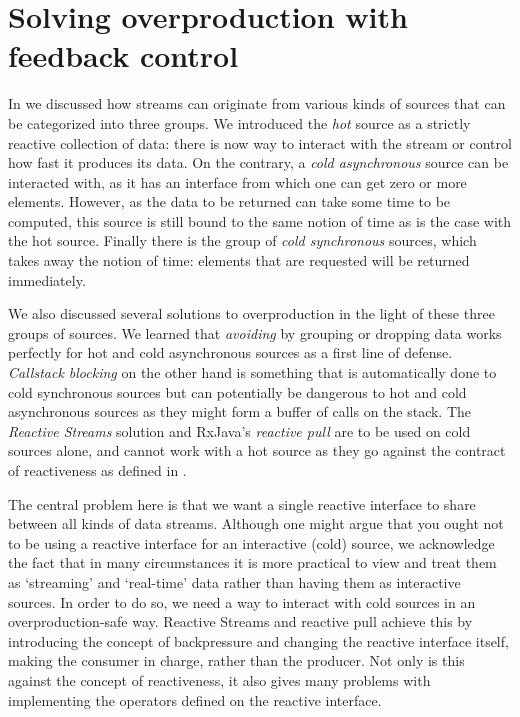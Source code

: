 \chapter{Solving overproduction with feedback control}
\label{chap:solving-overproduction}

In  we discussed how streams can originate from various kinds of sources that can be categorized into three groups. We introduced the \textit{hot} source as a strictly reactive collection of data: there is now way to interact with the stream or control how fast it produces its data. On the contrary, a \textit{cold asynchronous} source can be interacted with, as it has an interface from which one can get zero or more elements. However, as the data to be returned can take some time to be computed, this source is still bound to the same notion of time as is the case with the hot source. Finally there is the group of \textit{cold synchronous} sources, which takes away the notion of time: elements that are requested will be returned immediately.

We also discussed several solutions to overproduction in the light of these three groups of sources. We learned that \textit{avoiding} by grouping or dropping data works perfectly for hot and cold asynchronous sources as a first line of defense. \textit{Callstack blocking} on the other hand is something that is automatically done to cold synchronous sources but can potentially be dangerous to hot and cold asynchronous sources as they might form a buffer of calls on the stack. The \textit{Reactive Streams} solution and RxJava's \textit{reactive pull} are to be used on cold sources alone, and cannot work with a hot source as they go against the contract of reactiveness as defined in \cite{berry1991-Reactive}.

The central problem here is that we want a single reactive interface to share between all kinds of data streams. Although one might argue that you ought not to be using a reactive interface for an interactive (cold) source, we acknowledge the fact that in many circumstances it is more practical to view and treat them as `streaming' and `real-time' data rather than having them as interactive sources. In order to do so, we need a way to interact with cold sources in an overproduction-safe way. Reactive Streams and reactive pull achieve this by introducing the concept of backpressure and changing the reactive interface itself, making the consumer in charge, rather than the producer. Not only is this against the concept of reactiveness, it also gives many problems with implementing the operators defined on the reactive interface.

